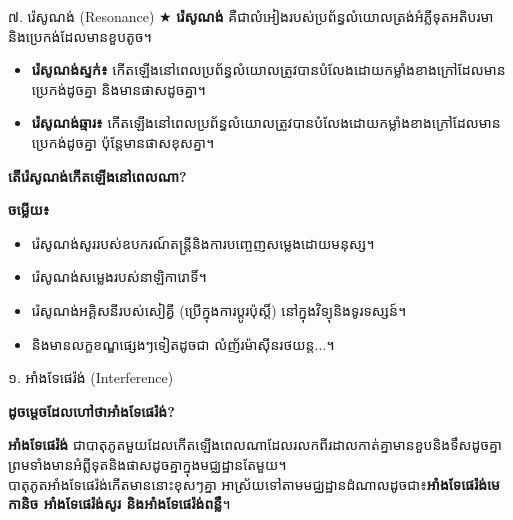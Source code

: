 \khmertopic
{៧. រ៉េសូណង់ {\englishfont (Resonance)}}
$\bigstar$ \hspace{1em} \textbf{រ៉េសូណង់}
គឺជាលំអៀងរបស់ប្រព័ន្ធលំយោលត្រង់អំភ្លីទុតអតិបរមា
និងប្រេកង់ដែលមានខួបតូច។
\begin{itemize}
	[label=\textcolor{bacpink}{\faCarrot}]
	\item \textbf{រ៉េសូណង់ស្ទក់៖ }
	កើតឡើងនៅពេលប្រព័ន្ធលំយោលត្រូវបានបំលែងដោយកម្លាំងខាងក្រៅដែលមានប្រេកង់ដូចគ្នា
	និងមានផាសដូចគ្នា។
	\item \textbf{រ៉េសូណង់ឆ្មារ៖ }
	កើតឡើងនៅពេលប្រព័ន្ធលំយោលត្រូវបានបំលែងដោយកម្លាំងខាងក្រៅដែលមានប្រេកង់ដូចគ្នា
	ប៉ុន្តែមានផាសខុសគ្នា។
\end{itemize}
\noindent \begin{center}
	          \textbf{តើរ៉េសូណង់កើតឡើងនៅពេលណា?}
\end{center}
\noindent \textbf{\color{brownheader} ចម្លើយ៖}\\
\hspace{2em}\begin{itemize}[label=
\textcolor{bacpink}{\faCaretRight}]
				 \item
				 រ៉េសូណង់សូររបស់ឧបករណ៍តន្ត្រីនិងការបញ្ចេញសម្លេងដោយមនុស្ស។
				 \item
				 រ៉េសូណង់សម្លេងរបស់នាឡិការោទិ៍។
				 \item រ៉េសូណង់អគ្គិសនីរបស់សៀគ្វី
				 (ប្រើក្នុងការប្តូរប៉ុស្តិ៍)
				 នៅក្នុងវិទ្យុនិងទូរទស្សន៍។
				 \item
				 និងមានលក្ខខណ្ឌផ្សេងៗទៀតដូចជា
				 លំញ័រម៉ាសុីនរថយន្ត...។
\end{itemize}

\clearpage


\tanbgdivider


\khmertopic
{១. អាំងទែផេរ៉ង់ {\englishfont (Interference)}}
\begin{center}
	\textbf{ដូចម្តេចដែលហៅថាអាំងទែផេរ៉ង់?}
\end{center}
\hspace{2em}\textbf{អាំងទែផេរ៉ង់}
ជាបាតុភូតមួយដែលកើតឡើងពេលណាដែលរលកពីរដាលកាត់គ្នាមានខួបនិងទឹសដូចគ្នា
ព្រមទាំងមានអំព្លីទុតនិងផាសដូចគ្នាក្នុងមជ្ឈដ្ឋានតែមួយ។
\\
បាតុភូតអាំងទែផេរ៉ង់កើតមាននោះខុសៗគ្នា
អាស្រ័យទៅតាមមជ្ឈដ្ឋានដំណាលដូចជា៖\textbf
{អាំងទែផេរ៉ង់មេកានិច អាំងទែផេរ៉ង់សូរ
និងអាំងទែផេរ៉ង់ពន្លឺ}។

